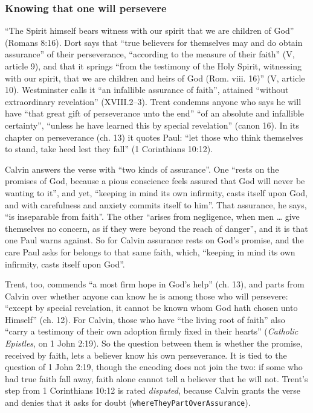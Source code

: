 \documentclass[11pt]{article}
\begin{document}
\subsubsection*{Knowing that one will persevere}
“The Spirit himself bears witness with our spirit that we are children of God” (Romans 8:16). Dort says that “true believers for themselves may and do obtain assurance” of their perseverance, “according to the measure of their faith” (V, article 9), and that it springs “from the testimony of the Holy Spirit, witnessing with our spirit, that we are children and heirs of God (Rom. viii. 16)” (V, article 10). Westminster calls it “an infallible assurance of faith”, attained “without extraordinary revelation” (XVIII.2–3). Trent condemns anyone who says he will have “that great gift of perseverance unto the end” “of an absolute and infallible certainty”, “unless he have learned this by special revelation” (canon 16). In its chapter on perseverance (ch. 13) it quotes Paul: “let those who think themselves to stand, take heed lest they fall” (1 Corinthians 10:12).

Calvin answers the verse with “two kinds of assurance”. One “rests on the promises of God, because a pious conscience feels assured that God will never be wanting to it”, and yet, “keeping in mind its own infirmity, casts itself upon God, and with carefulness and anxiety commits itself to him”. That assurance, he says, “is inseparable from faith”. The other “arises from negligence, when men … give themselves no concern, as if they were beyond the reach of danger”, and it is that one Paul warns against. So for Calvin assurance rests on God’s promise, and the care Paul asks for belongs to that same faith, which, “keeping in mind its own infirmity, casts itself upon God”.

Trent, too, commends “a most firm hope in God’s help” (ch. 13), and parts from Calvin over whether anyone can know he is among those who will persevere: “except by special revelation, it cannot be known whom God hath chosen unto Himself” (ch. 12). For Calvin, those who have “the living root of faith” also “carry a testimony of their own adoption firmly fixed in their hearts” (\emph{Catholic Epistles}, on 1 John 2:19). So the question between them is whether the promise, received by faith, lets a believer know his own perseverance. It is tied to the question of 1 John 2:19, though the encoding does not join the two: if some who had true faith fall away, faith alone cannot tell a believer that he will not. Trent’s step from 1 Corinthians 10:12 is rated \emph{disputed}, because Calvin grants the verse and denies that it asks for doubt (\texttt{where\allowbreak{}They\allowbreak{}Part\allowbreak{}Over\allowbreak{}Assurance}).
\end{document}
